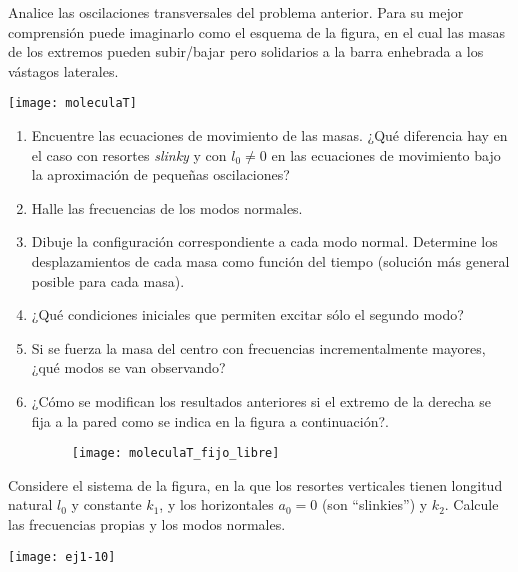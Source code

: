 \item
\begin{minipage}[t][2.2cm]{0.5\textwidth}
Analice las oscilaciones transversales del problema anterior.
Para su mejor comprensión puede imaginarlo como el esquema de la figura, en el cual las masas de los extremos pueden subir/bajar pero solidarios a la barra enhebrada a los vástagos laterales. 
\end{minipage}
\begin{minipage}[c][0cm][t]{0.45\textwidth}
  \texttt{[image: moleculaT]}
\end{minipage}
\begin{enumerate}
	\item Encuentre las ecuaciones de movimiento de las masas.
	¿Qué diferencia hay en el caso con resortes \emph{slinky} y con $l_0 \neq 0$ en las ecuaciones de movimiento bajo la aproximación de pequeñas oscilaciones? 
	\item Halle las frecuencias de los modos normales.
	\item Dibuje la configuración correspondiente a cada modo normal.
Determine los desplazamientos de cada masa como función del tiempo (solución más general posible para cada masa).
	\item ¿Qué condiciones iniciales que permiten excitar sólo el segundo modo?
	\item Si se fuerza la masa del centro con frecuencias incrementalmente mayores, ¿qué modos se van observando?
	\item ¿Cómo se modifican los resultados anteriores si el extremo de la derecha se fija a la pared como se indica en la figura a continuación?.
	\begin{figure}[h]
		\centering
		\texttt{[image: moleculaT\_fijo\_libre]}
	\end{figure} 
\end{enumerate}



\item
\begin{minipage}[t][1.2cm]{0.6\textwidth}
Considere el sistema de la figura, en la que los resortes verticales tienen longitud natural $l_0$ y constante $k_1$, y los horizontales $a_0= 0$ (son ``slinkies'') y $k_2$.
Calcule las frecuencias propias y los modos normales. 
\end{minipage}
\begin{minipage}[c][1.2cm][t]{0.35\textwidth}
  \texttt{[image: ej1-10]}
\end{minipage}
